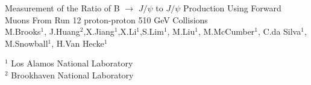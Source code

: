 \documentclass[12pt]{article}
\newcommand{\pt}{$P_{t}$ }
\newcommand{\jpsi}{$J/\psi$ }
\begin{document}
\begin{titlepage}
\begin{center}
 {\LARGE Measurement of the Ratio of B $\to$ \jpsi to \jpsi Production Using Forward Muons From Run 12 proton-proton 510 GeV Collisions} \\
\vspace{15mm}
M.Brooks$^{\mbox{1}}$, J.Huang$^{\mbox{2}}$,X.Jiang$^{\mbox{1}}$,X.Li$^{\mbox{1}}$,S.Lim$^{\mbox{1}}$, M.Liu$^{\mbox{1}}$, M.McCumber$^{\mbox{1}}$, C.da Silva$^{\mbox{1}}$, M.Snowball$^{\mbox{1}}$, H.Van Hecke$^{\mbox{1}}$

\vspace{1cm}

$^{\mbox{1}}$ Los Alamos National Laboratory \\
$^{\mbox{2}}$ Brookhaven National Laboratory  \\
\end{center}

\vspace{2cm}
\date{today}

\vspace{2cm}




\begin{abstract}

With the addition of the Forward Vertex detector to the PHENIX experiment, it is now possible to precisely measure the vertex position in 
both heavy ion and proton-proton events.  This precision gives the ability to measure the Distance of Closest Approach of all tracks to
the precisely measured vertex, allowing one to discern prompt muons from heavy flavor decays that fly some distance before decaying.
In this paper, Run 12 proton-proton collisions at $\sqrt{s} = $ 510 GeV from the PHENIX experiment will be analyzed using the DCA to 
discriminate between B $\to$ \jpsi and prompt \jpsi's decaying into muons Finally, a ratio of B to \jpsi production by \pt is presented.

\end{abstract}

\end{titlepage}
\end{document}
